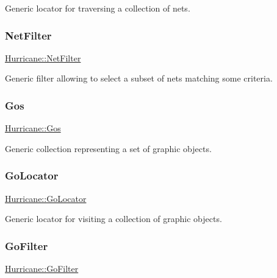Generic locator for traversing a collection of nets. \mbox{\label{namespaceHurricane_a0dfd2c5b40325a919d139091312732e9}} 
\subsubsection{\texorpdfstring{Net\+Filter}{NetFilter}}
{\footnotesize\ttfamily \hyperlink{namespaceHurricane_a0dfd2c5b40325a919d139091312732e9}{Hurricane\+::\+Net\+Filter}}

Generic filter allowing to select a subset of nets matching some criteria. \mbox{\label{namespaceHurricane_a4456a34f3bc6766d471c3064ace19759}} 
\subsubsection{\texorpdfstring{Gos}{Gos}}
{\footnotesize\ttfamily \hyperlink{namespaceHurricane_a4456a34f3bc6766d471c3064ace19759}{Hurricane\+::\+Gos}}

Generic collection representing a set of graphic objects. \mbox{\label{namespaceHurricane_ab7d66a25194b15d7646c93bcc1b15fc8}} 
\subsubsection{\texorpdfstring{Go\+Locator}{GoLocator}}
{\footnotesize\ttfamily \hyperlink{namespaceHurricane_ab7d66a25194b15d7646c93bcc1b15fc8}{Hurricane\+::\+Go\+Locator}}

Generic locator for visiting a collection of graphic objects. \mbox{\label{namespaceHurricane_a372aada7b76742fd900d0bb2c5398e0c}} 
\subsubsection{\texorpdfstring{Go\+Filter}{GoFilter}}
{\footnotesize\ttfamily \hyperlink{namespaceHurricane_a372aada7b76742fd900d0bb2c5398e0c}{Hurricane\+::\+Go\+Filter}}

